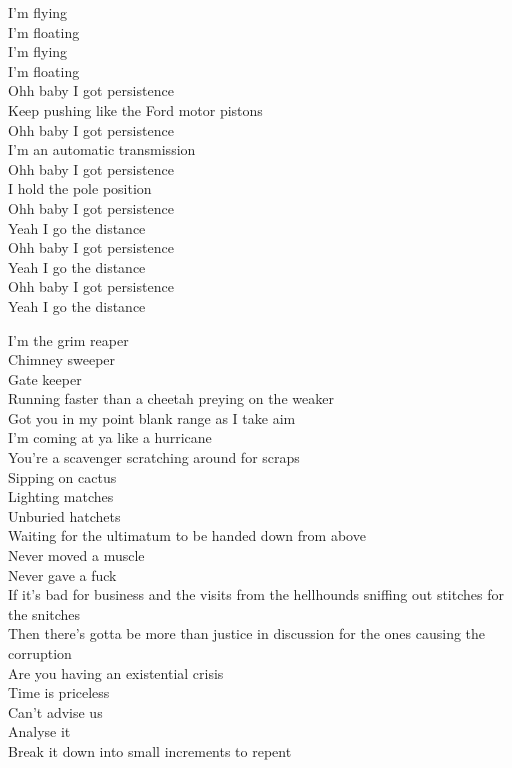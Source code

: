 I'm flying\\
I'm floating\\
I'm flying\\
I'm floating\\

Ohh baby I got persistence\\
Keep pushing like the Ford motor pistons\\
Ohh baby I got persistence\\
I'm an automatic transmission\\
Ohh baby I got persistence\\
I hold the pole position\\
Ohh baby I got persistence\\
Yeah I go the distance\\
Ohh baby I got persistence\\
Yeah I go the distance\\
Ohh baby I got persistence\\
Yeah I go the distance\\




I'm the grim reaper\\
Chimney sweeper\\
Gate keeper\\
Running faster than a cheetah preying on the weaker\\
Got you in my point blank range as I take aim\\
I'm coming at ya like a hurricane\\
You're a scavenger scratching around for scraps\\
Sipping on cactus\\
Lighting matches\\
Unburied hatchets\\
Waiting for the ultimatum to be handed down from above\\
Never moved a muscle\\
Never gave a fuck\\

If it's bad for business and the visits from the hellhounds sniffing out stitches for the snitches\\
Then there's gotta be more than justice in discussion for the ones causing the corruption\\
Are you having an existential crisis\\
Time is priceless\\
Can't advise us\\
Analyse it\\
Break it down into small increments to repent\\


